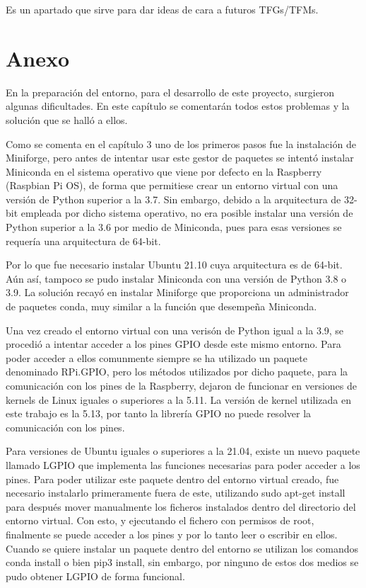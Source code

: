 \documentclass[a4paper, 12pt]{book}
\begin{document}
Es un apartado que sirve para dar ideas de cara a futuros TFGs/TFMs.

\chapter{Anexo}
\label{chap:anexo}

En la preparación del entorno, para el desarrollo de este proyecto, surgieron algunas dificultades. En este capítulo se comentarán todos estos problemas y la solución que se halló a ellos.

Como se comenta en el capítulo 3 uno de los primeros pasos fue la instalación de Miniforge, pero antes de intentar usar este gestor de paquetes se intentó instalar Miniconda en el sistema operativo que viene por defecto en la Raspberry (Raspbian Pi OS), de forma que permitiese crear un entorno virtual con una versión de Python superior a la 3.7. Sin embargo, debido a la arquitectura de 32-bit empleada por dicho sistema operativo, no era posible instalar una versión de Python superior a la 3.6 por medio de Miniconda, pues para esas versiones se requería una arquitectura de 64-bit.

Por lo que fue necesario instalar Ubuntu 21.10 cuya arquitectura es de 64-bit. Aún así, tampoco se pudo instalar Miniconda con una versión de Python 3.8 o 3.9. La solución recayó en instalar Miniforge que proporciona un administrador de paquetes conda, muy similar a la función que desempeña Miniconda.

Una vez creado el entorno virtual con una verisón de Python igual a la 3.9, se procedió a intentar acceder a los pines GPIO desde este mismo entorno. Para poder acceder a ellos comunmente siempre se ha utilizado un paquete denominado RPi.GPIO, pero los métodos utilizados por dicho paquete, para la comunicación con los pines de la Raspberry, dejaron de funcionar en versiones de kernels de Linux iguales o superiores a la 5.11. La versión de kernel utilizada en este trabajo es la 5.13, por tanto la librería GPIO no puede resolver la comunicación con los pines.

Para versiones de Ubuntu iguales o superiores a la 21.04, existe un nuevo paquete llamado LGPIO que implementa las funciones necesarias para poder acceder a los pines. Para poder utilizar este paquete dentro del entorno virtual creado, fue necesario instalarlo primeramente fuera de este, utilizando sudo apt-get install para después mover manualmente los ficheros instalados dentro del directorio del entorno virtual. Con esto, y ejecutando el fichero con permisos de root, finalmente se puede acceder a los pines y por lo tanto leer o escribir en ellos.\\
Cuando se quiere instalar un paquete dentro del entorno se utilizan los comandos conda install o bien pip3 install, sin embargo, por ninguno de estos dos medios se pudo obtener LGPIO de forma funcional.
\end{document}

